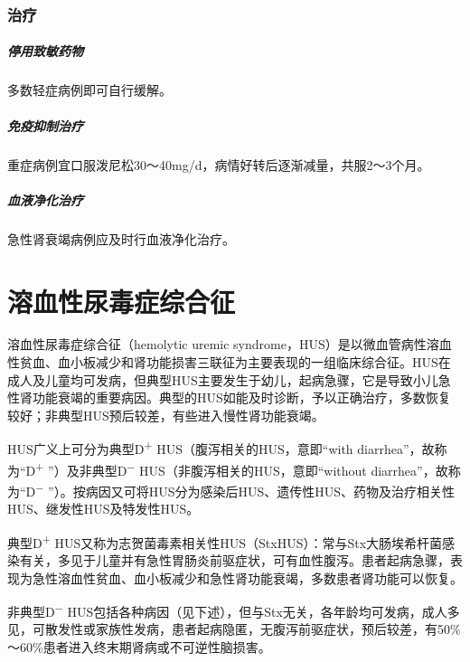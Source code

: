 \subsection{治疗}

\paragraph{停用致敏药物}

多数轻症病例即可自行缓解。

\paragraph{免疫抑制治疗}

重症病例宜口服泼尼松30～40mg/d，病情好转后逐渐减量，共服2～3个月。

\paragraph{血液净化治疗}

急性肾衰竭病例应及时行血液净化治疗。

\protect\hypertarget{text00344.html}{}{}

\chapter{溶血性尿毒症综合征}

溶血性尿毒症综合征（hemolytic uremic
syndrome，HUS）是以微血管病性溶血性贫血、血小板减少和肾功能损害三联征为主要表现的一组临床综合征。HUS在成人及儿童均可发病，但典型HUS主要发生于幼儿，起病急骤，它是导致小儿急性肾功能衰竭的重要病因。典型的HUS如能及时诊断，予以正确治疗，多数恢复较好；非典型HUS预后较差，有些进入慢性肾功能衰竭。

HUS广义上可分为典型D\textsuperscript{+} HUS（腹泻相关的HUS，意即“with
diarrhea”，故称为“D\textsuperscript{+}
”）及非典型D\textsuperscript{−} HUS（非腹泻相关的HUS，意即“without
diarrhea”，故称为“D\textsuperscript{−}
”）。按病因又可将HUS分为感染后HUS、遗传性HUS、药物及治疗相关性HUS、继发性HUS及特发性HUS。

典型D\textsuperscript{+}
HUS又称为志贺菌毒素相关性HUS（StxHUS）：常与Stx大肠埃希杆菌感染有关，多见于儿童并有急性胃肠炎前驱症状，可有血性腹泻。患者起病急骤，表现为急性溶血性贫血、血小板减少和急性肾功能衰竭，多数患者肾功能可以恢复。

非典型D\textsuperscript{−}
HUS包括各种病因（见下述），但与Stx无关，各年龄均可发病，成人多见，可散发性或家族性发病，患者起病隐匿，无腹泻前驱症状，预后较差，有50\%～60\%患者进入终末期肾病或不可逆性脑损害。

